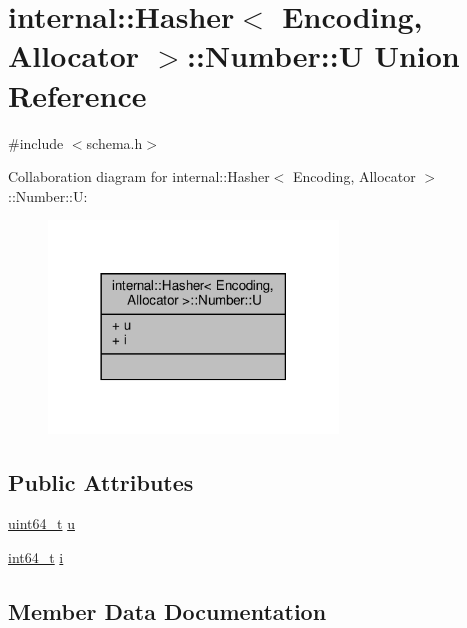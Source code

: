 \hypertarget{unioninternal_1_1Hasher_1_1Number_1_1U}{}\section{internal\+:\+:Hasher$<$ Encoding, Allocator $>$\+:\+:Number\+:\+:U Union Reference}
\label{unioninternal_1_1Hasher_1_1Number_1_1U}


{\ttfamily \#include $<$schema.\+h$>$}



Collaboration diagram for internal\+:\+:Hasher$<$ Encoding, Allocator $>$\+:\+:Number\+:\+:U\+:
\nopagebreak
\begin{figure}[H]
\begin{center}
\leavevmode
\includegraphics[width=218pt]{unioninternal_1_1Hasher_1_1Number_1_1U__coll__graph}
\end{center}
\end{figure}
\subsection*{Public Attributes}
\begin{DoxyCompactItemize}
\item 
\hyperlink{stdint_8h_aec6fcb673ff035718c238c8c9d544c47}{uint64\+\_\+t} \hyperlink{unioninternal_1_1Hasher_1_1Number_1_1U_a6380a48b72a4bb5dd7291d47814e6421}{u}
\item 
\hyperlink{stdint_8h_a414156feea104f8f75b4ed9e3121b2f6}{int64\+\_\+t} \hyperlink{unioninternal_1_1Hasher_1_1Number_1_1U_a19099b91768e67f02ed5a27fc157974b}{i}
\end{DoxyCompactItemize}


\subsection{Member Data Documentation}
\mbox{\label{unioninternal_1_1Hasher_1_1Number_1_1U_a19099b91768e67f02ed5a27fc157974b}} 
